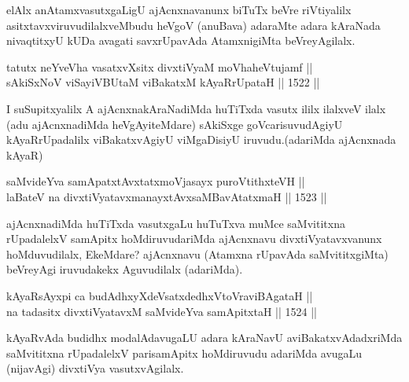 \begin{artha}
elAlx anAtamxvasutxgaLigU ajAcnxnavanunx biTuTx beVre riVtiyalilx asitxtavxviruvudilalxveMbudu heVgoV (anuBava) adaraMte adara kAraNada nivaqtitxyU kUDa avagati savxrUpavAda AtamxnigiMta beVreyAgilalx.
\end{artha}

\begin{shl}
tatutx neYveVha vasatxvXsitx divxtiVyaM moVhaheVtujamf || \\
sAkiSxNoV viSayiVBUtaM viBakatxM kAyaRrUpataH ||  1522 ||  
\end{shl}

\begin{artha}
I suSupitxyalilx A ajAcnxnakAraNadiMda huTiTxda vasutx ililx ilalxveV ilalx (adu ajAcnxnadiMda heVgAyiteMdare) sAkiSxge goVcarisuvudAgiyU kAyaRrUpadalilx viBakatxvAgiyU viMgaDisiyU iruvudu.(adariMda ajAcnxnada kAyaR)
\end{artha}

\begin{shl}
saMvideYva samApatxtAvxtatxmoVjasayx puroVtithxteVH ||  \\
laBateV na divxtiVyatavxmanayxtAvxsaMBavAtatxmaH ||  1523 ||  
\end{shl}

\begin{artha}
ajAcnxnadiMda huTiTxda vasutxgaLu huTuTxva muMce saMvititxna rUpadalelxV samApitx hoMdiruvudariMda ajAcnxnavu divxtiVyatavxvanunx hoMduvudilalx, EkeMdare? ajAcnxnavu (Atamxna rUpavAda saMvititxgiMta) beVreyAgi iruvudakekx Aguvudilalx (adariMda).
\end{artha}

\begin{shl}
kAyaRsAyxpi ca budAdhxyXdeVsatxdedhxVtoVraviBAgataH ||  \\
na tadasitx divxtiVyatavxM saMvideYva samApitxtaH ||  1524 ||  
\end{shl}

\begin{artha}
kAyaRvAda budidhx modalAdavugaLU adara kAraNavU aviBakatxvAdadxriMda saMvititxna rUpadalelxV parisamApitx hoMdiruvudu adariMda avugaLu (nijavAgi) divxtiVya vasutxvAgilalx.
\end{artha}

